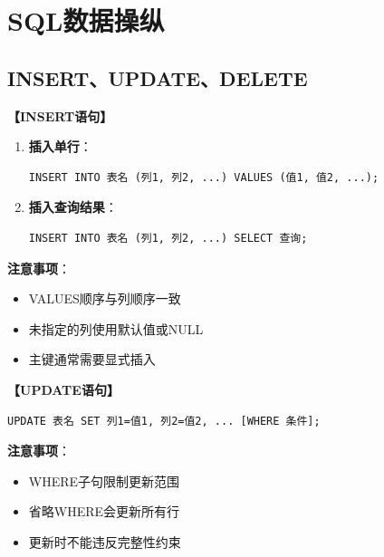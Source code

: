 \documentclass[12pt, a4paper]{article}
\newenvironment{bluebox}[1]{%
  \begin{trivlist}
  \item[\hskip\labelsep \textbf{#1}]
  \setlength{\parskip}{0.5ex}
  \setlength{\itemsep}{0.5ex}
}{%
  \end{trivlist}
}
\begin{document}
\section{SQL数据操纵}

\subsection{INSERT、UPDATE、DELETE}

\begin{bluebox}{数据插入}
	\textbf{【INSERT语句】}

	\begin{enumerate}[leftmargin=*, label=\textbf{\arabic*.}]
		\item \textbf{插入单行}：
		      \begin{verbatim}
INSERT INTO 表名 (列1, 列2, ...) VALUES (值1, 值2, ...);
		      \end{verbatim}
		\item \textbf{插入查询结果}：
		      \begin{verbatim}
INSERT INTO 表名 (列1, 列2, ...) SELECT 查询;
		      \end{verbatim}
	\end{enumerate}

	\textbf{注意事项}：
	\begin{itemize}
		\item VALUES顺序与列顺序一致
		\item 未指定的列使用默认值或NULL
		\item 主键通常需要显式插入
	\end{itemize}
\end{bluebox}

\begin{bluebox}{数据更新}
	\textbf{【UPDATE语句】}

	\begin{verbatim}
UPDATE 表名 SET 列1=值1, 列2=值2, ... [WHERE 条件];
	\end{verbatim}

	\textbf{注意事项}：
	\begin{itemize}
		\item WHERE子句限制更新范围
		\item 省略WHERE会更新所有行
		\item 更新时不能违反完整性约束
	\end{itemize}
\end{bluebox}
\end{document}
